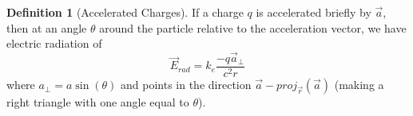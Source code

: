 \documentclass[12pt]{article}
\theoremstyle{definition}
\newtheorem{defn}[thm]{Definition}
\theoremstyle{remark}
\numberwithin{equation}{section}
\begin{document}
\begin{defn}[Accelerated Charges]
		If a charge $q$ is accelerated briefly by $\vec{a}$, then at an angle $\theta$ around the particle relative to the acceleration vector, we have electric radiation of \begin{equation}
				\vec{E}_{rad} = k_e\frac{-q\vec{a}_{\perp}}{c^2r}
		\end{equation}
		where $a_{\perp} = a\sin(\theta)$ and points in the direction $\vec{a} - proj_{\vec{r}}(\vec{a})$ (making a right triangle with one angle equal to $\theta$).
\end{defn}


\end{document}
